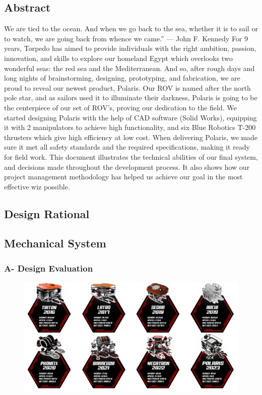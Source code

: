 \documentclass[a4paper,12pt,leqno]{report}
\begin{document}
\newpage
\textcolor{red!60}{
\section{Abstract}}
We are tied to the ocean. And when we go back to the sea, whether it is to sail or to watch, we  are going back from whence we came.” — John F. Kennedy For 9 years, Torpedo has aimed to provide individuals with the right ambition, passion,  innovation, and skills to explore our homeland Egypt which overlooks two wonderful seas: the red sea and the Mediterranean. 
And so, after rough days and long nights of brainstorming,  
designing, prototyping, and fabrication, we are proud to reveal our  
newest product, Polaris. 
Our ROV is named after the north pole star, and as sailors used it  
to illuminate their darkness, Polaris is going to be the centerpiece of our set of ROV’s, proving our dedication to the field. 
We started designing Polaris with the help of CAD software   
(Solid Works), equipping it with 2 manipulators to achieve high  functionality, and six Blue Robotics T-200 thrusters which give high  efficiency at low cost. 
When delivering Polaris, we made sure it met all safety standards and the required specifications, making it ready for field work. This document illustrates the technical abilities of our final system, and decisions made throughout the development process. It also shows how  our project management methodology has helped us achieve our goal in the most effective wiz possible. \\
\textcolor{red!60}{
\section{Design Rational}}
\textcolor{blue!90}{
\subsection{Mechanical System}}
\textcolor{blue!40}{
\subsubsection{A- Design Evaluation}}
\begin{figure}[H]
	\includegraphics[width=\textwidth]{Design_Evaluation}
\end{figure}
\end{document}
